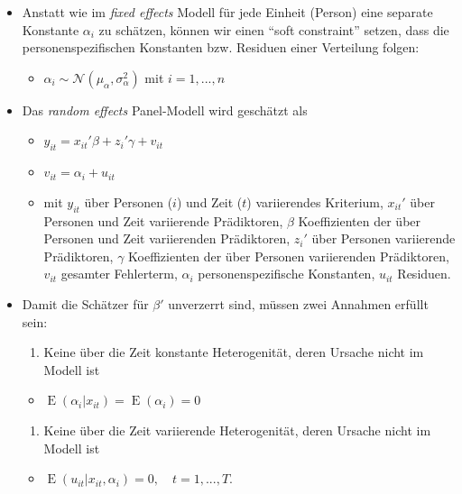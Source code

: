 \documentclass[
]{book}
\providecommand{\tightlist}{%
  \setlength{\itemsep}{0pt}\setlength{\parskip}{0pt}}
\begin{document}
\begin{itemize}
\item
  Anstatt wie im \emph{fixed effects} Modell für jede Einheit (Person) eine separate Konstante \(\alpha_i\) zu schätzen, können wir einen ``soft constraint'' \citep[S. 257]{gelmanDataAnalysisUsing2006} setzen, dass die personenspezifischen Konstanten bzw. Residuen einer Verteilung folgen:

  \begin{itemize}
  \tightlist
  \item
    \(\alpha_{i} ∼ \mathcal{N}(\mu_{\alpha},\sigma^2_\alpha)\) mit \(i = 1,...,n\)
  \end{itemize}
\item
  Das \emph{random effects} Panel-Modell wird geschätzt als

  \begin{itemize}
  \tightlist
  \item
    \(y_{it}=x_{it}'\beta + z_i'\gamma + v_{it}\)
  \item
    \(v_{it} = \alpha_{i} + u_{it}\)
  \item
    mit \(y_{it}\) über Personen (\(i\)) und Zeit (\(t\)) variierendes Kriterium, \(x_{it}'\) über Personen und Zeit variierende Prädiktoren, \(\beta\) Koeffizienten der über Personen und Zeit variierenden Prädiktoren, \(z_i'\) über Personen variierende Prädiktoren, \(\gamma\) Koeffizienten der über Personen variierenden Prädiktoren, \(v_{it}\) gesamter Fehlerterm, \(\alpha_{i}\) personenspezifische Konstanten, \(u_{it}\) Residuen.
  \end{itemize}
\item
  Damit die Schätzer für \(\beta'\) unverzerrt sind, müssen zwei Annahmen erfüllt sein:

  \begin{enumerate}
  \def\labelenumi{\arabic{enumi}.}
  \tightlist
  \item
    Keine über die Zeit konstante Heterogenität, deren Ursache nicht im Modell ist
  \end{enumerate}

  \begin{itemize}
  \tightlist
  \item
    \({\displaystyle \operatorname {E} (\alpha _{i}|x_{it})=\operatorname {E} (\alpha _{i})=0}\)
  \end{itemize}

  \begin{enumerate}
  \def\labelenumi{\arabic{enumi}.}
  \setcounter{enumi}{1}
  \tightlist
  \item
    Keine über die Zeit variierende Heterogenität, deren Ursache nicht im Modell ist
  \end{enumerate}

  \begin{itemize}
  \tightlist
  \item
    \({\displaystyle \operatorname {E} (u_{it}|x_{it},\alpha _{i})=0,\quad t=1,...,T.}\)
  \end{itemize}
\end{itemize}
\end{document}
